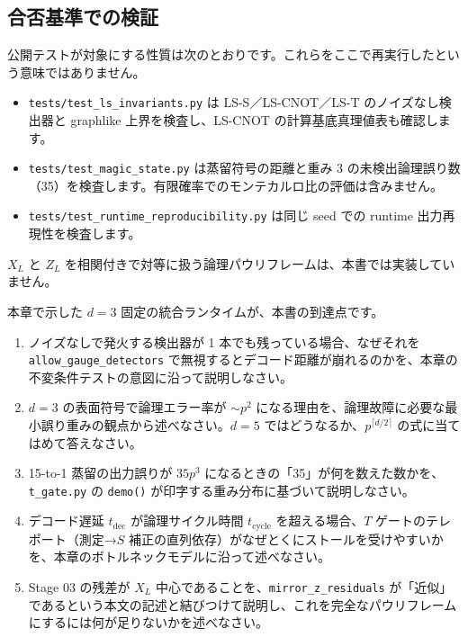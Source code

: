 \subsection*{合否基準での検証}

公開テストが対象にする性質は次のとおりです。これらをここで再実行したという意味ではありません。

\begin{itemize}
  \item \texttt{tests/test\_ls\_invariants.py} は LS-S／LS-CNOT／LS-T のノイズなし検出器と graphlike 上界を検査し、LS-CNOT の計算基底真理値表も確認します。
  \item \texttt{tests/test\_magic\_state.py} は蒸留符号の距離と重み 3 の未検出論理誤り数（35）を検査します。有限確率でのモンテカルロ比の評価は含みません。
  \item \texttt{tests/test\_runtime\_reproducibility.py} は同じ seed での runtime 出力再現性を検査します。
\end{itemize}

$X_L$ と $Z_L$ を相関付きで対等に扱う論理パウリフレームは、本書では実装していません。

本章で示した $d=3$ 固定の統合ランタイムが、本書の到達点です。

\begin{exercise}
  \begin{enumerate}
    \item ノイズなしで発火する検出器が 1 本でも残っている場合、なぜそれを \texttt{allow\_gauge\_detectors} で無視するとデコード距離が崩れるのかを、本章の不変条件テストの意図に沿って説明しなさい。
    \item $d=3$ の表面符号で論理エラー率が $\sim p^2$ になる理由を、論理故障に必要な最小誤り重みの観点から述べなさい。$d=5$ ではどうなるか、$p^{\lceil d/2\rceil}$ の式に当てはめて答えなさい。
    \item 15-to-1 蒸留の出力誤りが $35p^3$ になるときの「35」が何を数えた数かを、\texttt{t\_gate.py} の \texttt{demo()} が印字する重み分布に基づいて説明しなさい。
    \item デコード遅延 $t_{\mathrm{dec}}$ が論理サイクル時間 $t_{\mathrm{cycle}}$ を超える場合、$T$ ゲートのテレポート（測定→$S$ 補正の直列依存）がなぜとくにストールを受けやすいかを、本章のボトルネックモデルに沿って述べなさい。
    \item Stage 03 の残差が $X_L$ 中心であることを、\texttt{mirror\_z\_residuals} が「近似」であるという本文の記述と結びつけて説明し、これを完全なパウリフレームにするには何が足りないかを述べなさい。
  \end{enumerate}
\end{exercise}
